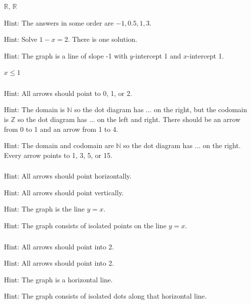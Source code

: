 \subsubsection*{ \answers}
\begin{apart}
    \item $\mathbb{R}$, $\mathbb{R}$
    \item Hint: The answers in some order are $-1, 0.5, 1, 3$.
    \item Hint: Solve $1-x=2$. There is one solution.
    \item Hint: The graph is a line of slope -1 with $y$-intercept 1 and $x$-intercept 1.
    \item $x \le 1$
\end{apart}

\subsubsection*{ \answers}
\begin{apart}
    \item Hint: All arrows should point to 0, 1, or 2.
    \item Hint: The domain is $\mathbb{N}$ so the dot diagram has $\ldots$ on the right, but the codomain is $\mathbb{Z}$ so the dot diagram has $\ldots$ on the left and right.  There should be an arrow from 0 to 1 and an arrow from 1 to 4.
    \item Hint:  The domain and codomain are $\mathbb{N}$ so the dot diagram has $\ldots$ on the right.  Every arrow points to 1, 3, 5, or 15.
\end{apart}

\subsubsection*{ \answers}
\begin{apart}
    \item Hint: All arrows should point horizontally.
    \item Hint: All arrows should point vertically.
    \item Hint: The graph is the line $y=x$.
    \item Hint: The graph consists of isolated points on the line $y=x$.
\end{apart}

\subsubsection*{ \answers}
\begin{apart}
    \item Hint: All arrows should point into 2.
    \item Hint: All arrows should point into 2.
    \item Hint: The graph is a horizontal line.
    \item Hint: The graph consists of isolated dots along that horizontal line. 
\end{apart}





